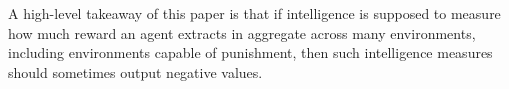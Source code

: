 \documentclass{article}
\begin{document}
A high-level takeaway of
this paper is that if intelligence is supposed to measure how much
reward an agent extracts in aggregate across many environments,
including environments capable of punishment, then such
intelligence measures should sometimes output negative
values.




\end{document}
